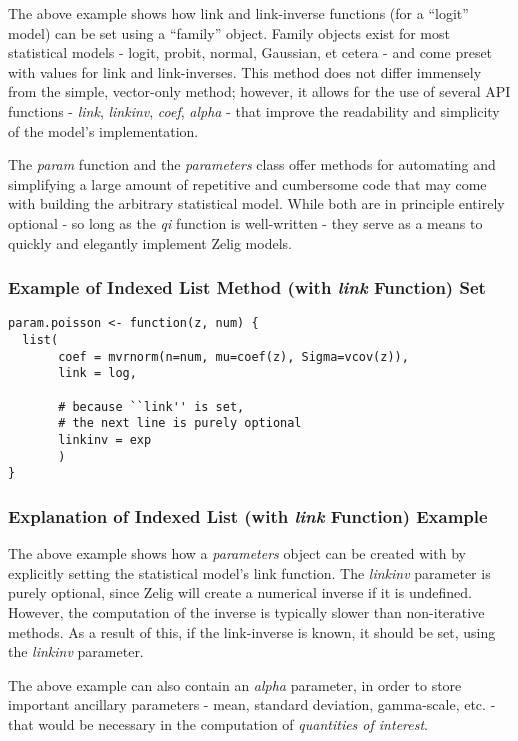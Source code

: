 \documentclass[11pt]{article}
\begin{document}
The above example shows how link and link-inverse functions (for a ``logit'' model) can be set using a ``family'' object.  Family objects exist for most statistical models - logit, probit, normal, Gaussian, et cetera - and come preset with values for link and link-inverses.  This method does not differ immensely from the simple, vector-only method; however, it allows for the use of several API functions - \emph{link}, \emph{linkinv}, \emph{coef}, \emph{alpha} - that improve the readability and simplicity of the model's implementation.

The \emph{param} function and the \emph{parameters} class offer methods for automating and simplifying a large amount of repetitive and cumbersome code that may come with building the arbitrary statistical model.  While both are in principle entirely optional - so long as the \emph{qi} function is well-written - they serve as a means to quickly and elegantly implement Zelig models.


\subsubsection{Example of Indexed List Method (with \emph{link} Function) Set}

\begin{verbatim}
param.poisson <- function(z, num) {
  list(
       coef = mvrnorm(n=num, mu=coef(z), Sigma=vcov(z)),
       link = log,
             
       # because ``link'' is set,
       # the next line is purely optional
       linkinv = exp
       )
}
\end{verbatim}



\subsubsection{Explanation of Indexed List (with \emph{link} Function) Example}

The above example shows how a \emph{parameters} object can be created with by explicitly setting the statistical model's link function.  The \emph{linkinv} parameter is purely optional, since Zelig will create a numerical inverse if it is undefined.  However, the computation of the inverse is typically slower than non-iterative methods.  As a result of this, if the link-inverse is known, it should be set, using the \emph{linkinv} parameter.

The above example can also contain an \emph{alpha} parameter, in order to store important ancillary parameters - mean, standard deviation, gamma-scale, etc. - that would be necessary in the computation of \emph{quantities of interest}.
\end{document}

